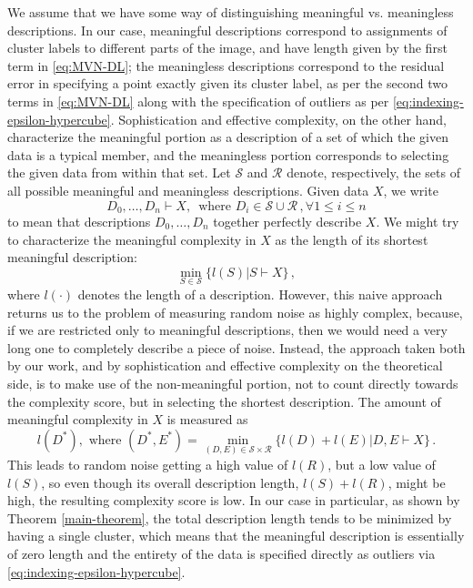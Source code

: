 \documentclass[a4paper,fleqn]{cas-sc}
\theoremstyle{remark}
\begin{document}
We assume that we have some way of distinguishing meaningful vs. meaningless descriptions. In our case, meaningful descriptions correspond to assignments of cluster labels to different parts of the image, and have length given by the first term in \eqref{eq:MVN-DL}; the meaningless descriptions correspond to the residual error in specifying a point exactly given its cluster label, as per the second two terms in \eqref{eq:MVN-DL} along with the specification of outliers as per \eqref{eq:indexing-epsilon-hypercube}. Sophistication and effective complexity, on the other hand, characterize the meaningful portion as a description of a set of which the given data is a typical member, and the meaningless portion corresponds to selecting the given data from within that set. Let $\mathcal{S}$ and $\mathcal{R}$ denote, respectively, the sets of all possible meaningful and meaningless descriptions. Given data $X$, we write 
\begin{equation}
 D_0, \dots, D_n \vdash X,\, \text{ where } D_i \in \mathcal{S} \cup \mathcal{R}\,, \forall 1 \leq i \leq n
\end{equation}
to mean that descriptions $D_0, \dots, D_n$ together perfectly describe $X$. We might try to characterize the meaningful complexity in $X$ as the length of its shortest meaningful description:
\begin{equation}
    \min_{S \in \mathcal{S}} \{l(S) | S \vdash X\}\,,
\end{equation}
where $l(\cdot)$ denotes the length of a description. However, this naive approach returns us to the problem of measuring random noise as highly complex, because, if we are restricted only to meaningful descriptions, then we would need a very long one to completely describe a piece of noise. Instead, the approach taken both by our work, and by sophistication and effective complexity on the theoretical side, is to make use of the non-meaningful portion, not to count directly towards the complexity score, but in selecting the shortest description. The amount of meaningful complexity in $X$ is measured as
\begin{equation}
    l(D^*), \text{  where  } (D^*,E^*) = \min_{(D,E) \in \mathcal{S} \times \mathcal{R}} \{l(D)+l(E) | D,E \vdash X\}\,.
\end{equation}
This leads to random noise getting a high value of $l(R)$, but a low value of $l(S)$, so even though its overall description length, $l(S) + l(R)$, might be high, the resulting complexity score is low. In our case in particular, as shown by Theorem \ref{main-theorem}, the total description length tends to be minimized by having a single cluster, which means that the meaningful description is essentially of zero length and the entirety of the data is specified directly as outliers via \eqref{eq:indexing-epsilon-hypercube}.
\end{document}
